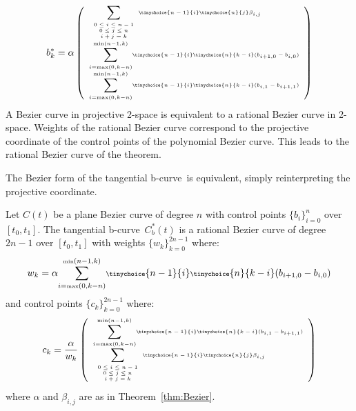 \documentclass[12pt]{article}
\newcommand{\btang}{tangential b-curve\ }
\begin{document}
\[
\label{eq:dualcoord}
\tiny{
b^*_k = \alpha
\left(
\begin{array}{l}
	\displaystyle{\sum_{\begin{array}{c} \mbox{\tiny{$0 \leq i \leq n-1$}} \\ 
		       \mbox{\tiny{$0 \leq j \leq n$}} \\ 
		       \mbox{\tiny{$i+j=k$}} \end{array}}}
	\tinychoice{n-1}{i} \tinychoice{n}{j} \beta_{i,j} \\
%	
	\displaystyle{\sum_{i=\mbox{\tiny{max}}(0,k-n)}^{\mbox{\tiny{min}}(n-1,k)}}
	\tinychoice{n-1}{i} \tinychoice{n}{k-i} (b_{i+1,0} - b_{i,0})\\
%	
	\displaystyle{\sum_{i=\mbox{\tiny{max}}(0,k-n)}^{\mbox{\tiny{min}}(n-1,k)}}
	\tinychoice{n-1}{i} \tinychoice{n}{k-i} (b_{i,1} - b_{i+1,1})
\end{array}
\right)}
\]
%
A Bezier curve in projective 2-space is equivalent to a 
rational Bezier curve in 2-space.
Weights of the rational Bezier curve correspond to the
projective coordinate of the control points of the polynomial Bezier curve.
This leads to the rational Bezier curve of the theorem.
\QED

\noindent The Bezier form of the \btang is equivalent, 
simply reinterpreting the projective coordinate.
%
\begin{theorem}
\label{thm:rationaldualb}
Let $C(t)$ be a plane Bezier curve of degree $n$ 
with control points $\{ b_i \}_{i=0}^n$ over $[t_0,t_1]$.
The \btang $C_b^*(t)$ is a rational Bezier curve of degree $2n-1$ 
over $[t_0,t_1]$ with weights $\{w_k\}_{k=0}^{2n-1}$ where: 
\begin{displaymath}
\scriptsize{
w_k = \alpha
\displaystyle{\sum_{i=\mbox{\tiny{max}}(0,k-n)}^{\mbox{\tiny{min}}(n-1,k)}}
	\tinychoice{n-1}{i} \tinychoice{n}{k-i} (b_{i+1,0} - b_{i,0})
}
\end{displaymath}
%
and control points $\{c_k\}_{k=0}^{2n-1}$ where:
\begin{displaymath}
\tiny{
c_k = \frac{\alpha}{w_k} 
\left(
\begin{array}{l}
	\displaystyle{\sum_{i=\mbox{\tiny{max}}(0,k-n)}^{\mbox{\tiny{min}}(n-1,k)}}
	\tinychoice{n-1}{i} \tinychoice{n}{k-i} (b_{i,1} - b_{i+1,1})\\
%
	\displaystyle{\sum_{\begin{array}{c} \mbox{\tiny{$0 \leq i \leq n-1$}} \\ 
		       \mbox{\tiny{$0 \leq j \leq n$}} \\ 
		       \mbox{\tiny{$i+j=k$}} \end{array}}}
	\tinychoice{n-1}{i} \tinychoice{n}{j} \beta_{i,j}
\end{array}
\right)
}
\end{displaymath}
where $\alpha$ and $\beta_{i,j}$ are as in Theorem~\ref{thm:Bezier}.
\end{theorem}
\end{document}
